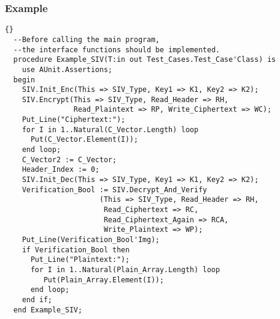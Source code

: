 \subsubsection*{Example}
\begin{lstlisting}{}
  --Before calling the main program, 
  --the interface functions should be implemented. 
  procedure Example_SIV(T:in out Test_Cases.Test_Case'Class) is
    use AUnit.Assertions; 
  begin
    SIV.Init_Enc(This => SIV_Type, Key1 => K1, Key2 => K2);
    SIV.Encrypt(This => SIV_Type, Read_Header => RH,
                Read_Plaintext => RP, Write_Ciphertext => WC);
    Put_Line("Ciphertext:");
    for I in 1..Natural(C_Vector.Length) loop
      Put(C_Vector.Element(I));
    end loop;
    C_Vector2 := C_Vector;
    Header_Index := 0;
    SIV.Init_Dec(This => SIV_Type, Key1 => K1, Key2 => K2);
    Verification_Bool := SIV.Decrypt_And_Verify
                      (This => SIV_Type, Read_Header => RH,
                       Read_Ciphertext => RC, 
                       Read_Ciphertext_Again => RCA,
                       Write_Plaintext => WP);
    Put_Line(Verification_Bool'Img);
    if Verification_Bool then
      Put_Line("Plaintext:");
      for I in 1..Natural(Plain_Array.Length) loop
         Put(Plain_Array.Element(I));
      end loop;
    end if;
  end Example_SIV;
\end{lstlisting}
